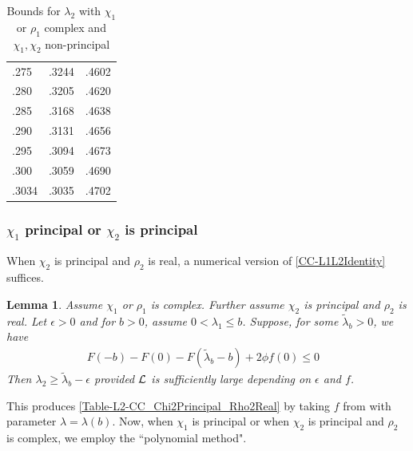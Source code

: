\documentclass[12pt,psamsfonts]{amsart}
\newtheorem{lem}[thm]{Lemma}
\theoremstyle{definition}
\theoremstyle{remark}
\numberwithin{equation}{section}
\begin{document}
\begin{table}
\begin{tabular}{l|c|c}
 .275 &  .3244 &  .4602 \\ 
 .280 &  .3205 &  .4620 \\ 
 .285 &  .3168 &  .4638 \\ 
 .290 &  .3131 &  .4656 \\ 
 .295 &  .3094 &  .4673 \\ 
 .300 &  .3059 &  .4690 \\ 
 .3034 &  .3035 &  .4702 \\ 
\end{tabular}
\caption{Bounds for $\lambda_2$ with $\chi_1$ or $\rho_1$ complex and $\chi_1, \chi_2$ non-principal}
\label{Table-L2-CC_Chi1Chi2NonPrincipal}
\end{table}




\subsubsection{$\chi_1$ principal or $\chi_2$ is principal}

When $\chi_2$ is principal and $\rho_2$ is real,  a numerical version of \cref{CC-L1L2Identity} suffices. 


\begin{lem} \label{CC-L1L2small} Assume $\chi_1$ or $\rho_1$ is complex. Further assume $\chi_2$ is principal and $\rho_2$ is real. Let $\epsilon > 0$ and for $b > 0$, assume $0 < \lambda_1 \leq b$. Suppose, for some $\tilde{\lambda}_b > 0$, we have 
\[
\begin{array}{ll}
F(-b) - F(0)- F(\tilde{\lambda}_b-b) +   2\phi f(0) \leq 0 & %
\end{array}
\]
Then $\lambda_2 \geq \tilde{\lambda}_b - \epsilon$ provided $\mathcal{L}$ is sufficiently large depending on $\epsilon$ and $f$.
\end{lem}
This produces \cref{Table-L2-CC_Chi2Principal_Rho2Real} by taking $f$ from \cite[Lemma 7.2]{HBLinnik} with parameter $\lambda = \lambda(b)$. Now, when $\chi_1$ is principal or when $\chi_2$ is principal and $\rho_2$ is complex, we employ the ``polynomial method".   
\end{document}
